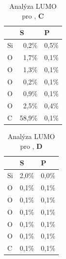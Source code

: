 \documentclass[
  digital, %
  table,   %
  lof,     %
  lot,     %
  oneside,
]{fithesis3}
\begin{document}
\begin{table}[htbp]
\caption{Analýza LUMO pro ,  \textbf{C}}
\begin{center}
\begin{tabular}{|l|r|r|}
\hline
 & \multicolumn{1}{l|}{S} & \multicolumn{1}{l|}{P} \\ \hline
Si & 0,2\% & 0,5\% \\ \hline
O & 1,7\% & 0,1\% \\ \hline
O & 1,3\% & 0,1\% \\ \hline
O & 0,2\% & 0,1\% \\ \hline
O & 0,9\% & 0,1\% \\ \hline
O & 2,5\% & 0,4\% \\ \hline
C & 58,9\% & 0,1\% \\ \hline
\end{tabular}
\end{center}
\label{si_ch3_och3_5_MPA}
\end{table}

\begin{table}[htbp]
\caption{Analýza LUMO pro , \textbf{D}}
\begin{center}
\begin{tabular}{|l|r|r|}
\hline
 & \multicolumn{1}{l|}{S} & \multicolumn{1}{l|}{P} \\ \hline
Si & 2,0\% & 0,0\% \\ \hline
O & 0,1\% & 0,1\% \\ \hline
O & 0,1\% & 0,1\% \\ \hline
O & 0,1\% & 0,1\% \\ \hline
O & 0,1\% & 0,1\% \\ \hline
O & 0,1\% & 0,1\% \\ \hline
C & 0,1\% & 0,1\% \\ \hline
\end{tabular}
\end{center}
\label{si_och3_6_MPA}
\end{table}
\end{document}
